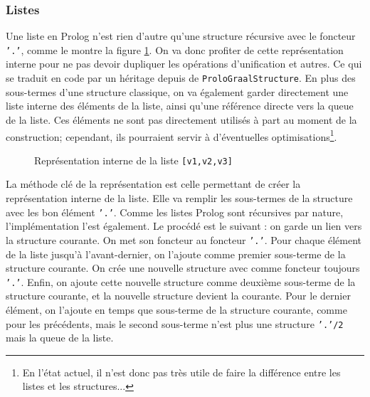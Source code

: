 \documentclass[../report.tex]{subfiles}
\begin{document}
\subsubsection{Listes}
Une liste en Prolog n'est rien d'autre qu'une structure récursive avec le foncteur \texttt{'.'}, comme le montre la figure \ref{fig:phase3internallist}. On va donc profiter de cette représentation interne pour ne pas devoir dupliquer les opérations d'unification et autres. Ce qui se traduit en code par un héritage depuis de \texttt{ProloGraalStructure}. En plus des sous-termes d'une structure classique, on va également garder directement une liste interne des éléments de la liste, ainsi qu'une référence directe vers la queue de la liste. Ces éléments ne sont pas directement utilisés à part au moment de la construction; cependant, ils pourraient servir à d'éventuelles optimisations\footnote{En l'état actuel, il n'est donc pas très utile de faire la différence entre les listes et les structures...}.
\begin{figure}[h]
    \centering
    \caption{Représentation interne de la liste \texttt{[v1,v2,v3]}}
    \label{fig:phase3internallist}
\end{figure}
La méthode clé de la représentation est celle permettant de créer la représentation interne de la liste. Elle va remplir les sous-termes de la structure avec les bon élément \texttt{'.'}. Comme les listes Prolog sont récursives par nature, l'implémentation l'est également. Le procédé est le suivant : on garde un lien vers la structure courante. On met son foncteur au foncteur \texttt{'.'}. Pour chaque élément de la liste jusqu'à l'avant-dernier, on l'ajoute comme premier sous-terme de la structure courante. On crée une nouvelle structure avec comme foncteur toujours \texttt{'.'}. Enfin, on ajoute cette nouvelle structure comme deuxième sous-terme de la structure courante, et la nouvelle structure devient la courante. Pour le dernier élément, on l'ajoute en temps que sous-terme de la structure courante, comme pour les précédents, mais le second sous-terme n'est plus une structure \texttt{'.'/2} mais la queue de la liste.
\end{document}
